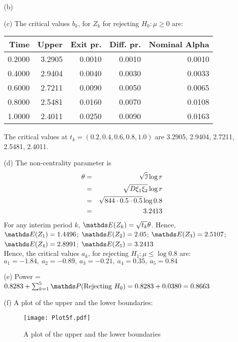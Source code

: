\documentclass[11pt,a4paper]{article}
\begin{document}
\begin{enumerate}
\begin{enumerate}
\item[(b)] 
\item[(c)] The critical values $b_k$, for $Z_k$ for rejecting $H_0: \mu \geq 0$ are:
\begin{table}[H]
\centering
\begin{tabular}{rrrrr}
  \hline
  Time &  Upper & Exit pr. & Diff. pr. & Nominal Alpha \\ 
  \hline
  0.2000 & 3.2905 & 0.0010 & 0.0010 & 0.0010 \\ 
  0.4000 & 2.9404 & 0.0040 & 0.0030 & 0.0033 \\ 
  0.6000 & 2.7211 & 0.0090 & 0.0050 & 0.0065 \\ 
  0.8000 & 2.5481 & 0.0160 & 0.0070 & 0.0108 \\ 
  1.0000 & 2.4011 & 0.0250 & 0.0090 & 0.0163 \\ 
  \hline
\end{tabular}
\end{table}
The critical values at $t_k = (0.2, 0.4, 0.6, 0.8, 1.0)$ are 3.2905, 2.9404, 2.7211, 2.5481, 2.4011.

\item[(d)] The non-centrality parameter is
\begin{eqnarray*}
 \theta & = & \sqrt{\mathcal{I}}\log r \\
        & = & \sqrt{D \xi_1 \xi_2} \log r \\
        & = & \sqrt{844 \cdot 0.5 \cdot 0.5 } \log 0.8 \\
        & = & 3.2413
\end{eqnarray*}
For any interim period $k$, $\Exp(Z_k) = \sqrt{t_k}\theta$. Hence,\\
$\Exp(Z_1) = 1.4496$; 
$\Exp(Z_2) = 2.05$; 
$\Exp(Z_3) = 2.5107$; 
$\Exp(Z_4) = 2.8991$; 
$\Exp(Z_5) = 3.2413$ \\
Hence, the critical values $a_k$, for rejecting $H_1: \mu \leq \log 0.8$ are:\\
$a_1 = -1.84,\ a_2 = -0.89,\ a_3 = -0.21,\ a_4 = 0.35,\ a_5 = 0.84$

\item[(e)] Power = $0.8283 + \sum_{k = 1}^5 \Prob(\text{Rejecting } H_0) = 0.8283 + 0.0380 = 0.8663$

\item[(f)] A plot of the upper and the lower boundaries:
\begin{figure}[H]
\begin{center}
\texttt{[image: Plot5f.pdf]}
\end{center}
\caption{A plot of the upper and the lower boundaries}
\end{figure}


\end{enumerate}
\end{enumerate}
\end{document}
